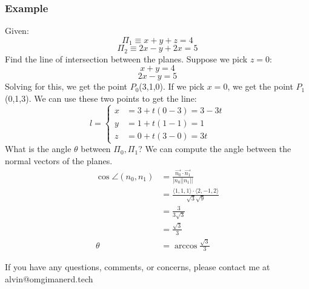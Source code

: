\documentclass[letterpaper, 12pt]{math}
\begin{document}
\subsubsection*{Example}
Given:
\[ \Pi_1 \equiv x+y+z = 4 \]
\[ \Pi_2 \equiv 2x-y+2x = 5 \]
Find the line of intersection between the planes. Suppose we pick \( z = 0 \):
\[ x+y = 4 \]
\[ 2x-y = 5 \]
Solving for this, we get the point \( P_0 \)(3,1,0). If we pick \( x = 0 \), we
get the point \( P_1 \)(0,1,3). We can use these two points to get the line:
\[ l = \begin{cases}
  x &= 3+t(0-3) = 3-3t\\
  y &= 1+t(1-1) = 1 \\
  z &= 0+t(3-0) = 3t
\end{cases} \]
What is the angle \( \theta \) between \( \Pi_0,\Pi_1 \)? We can compute the
angle between the normal vectors of the planes.
\begin{align*}
  \cos\angle(n_0,n_1) &= \frac{\vec{n_0}\cdot\vec{n_1}}{|n_0||n_1||} \\
  &= \frac{\langle1,1,1\rangle\cdot\langle2,-1,2\rangle}{\sqrt{3}\sqrt{9}} \\
  &= \frac{3}{3\sqrt{3}} \\
  &= \frac{\sqrt{3}}{3} \\
  \theta &= \arccos\frac{\sqrt{3}}{3}
\end{align*}

\begin{center}
  If you have any questions, comments, or concerns, please contact me at
  alvin@omgimanerd.tech
\end{center}
\end{document}
